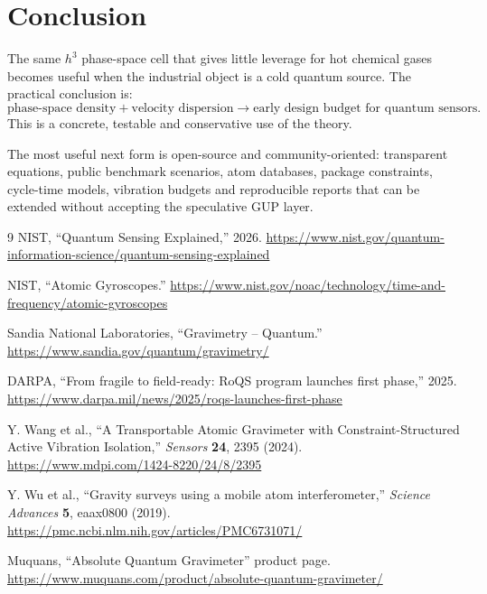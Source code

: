 \documentclass[11pt,a4paper]{article}
\begin{document}
\section{Conclusion}

The same $h^3$ phase-space cell that gives little leverage for hot chemical
gases becomes useful when the industrial object is a cold quantum source. The
practical conclusion is:
\begin{equation}
\text{phase-space density}+\text{velocity dispersion}
\longrightarrow
\text{early design budget for quantum sensors}.
\end{equation}
This is a concrete, testable and conservative use of the theory.

The most useful next form is open-source and community-oriented: transparent
equations, public benchmark scenarios, atom databases, package constraints,
cycle-time models, vibration budgets and reproducible reports that can be
extended without accepting the speculative GUP layer.

\begin{thebibliography}{9}
NIST, ``Quantum Sensing Explained,'' 2026.
\url{https://www.nist.gov/quantum-information-science/quantum-sensing-explained}

NIST, ``Atomic Gyroscopes.''
\url{https://www.nist.gov/noac/technology/time-and-frequency/atomic-gyroscopes}

Sandia National Laboratories, ``Gravimetry -- Quantum.''
\url{https://www.sandia.gov/quantum/gravimetry/}

DARPA, ``From fragile to field-ready: RoQS program launches first phase,'' 2025.
\url{https://www.darpa.mil/news/2025/roqs-launches-first-phase}

Y. Wang et al.,
``A Transportable Atomic Gravimeter with Constraint-Structured Active Vibration
Isolation,''
\emph{Sensors} \textbf{24}, 2395 (2024).
\url{https://www.mdpi.com/1424-8220/24/8/2395}

Y. Wu et al.,
``Gravity surveys using a mobile atom interferometer,''
\emph{Science Advances} \textbf{5}, eaax0800 (2019).
\url{https://pmc.ncbi.nlm.nih.gov/articles/PMC6731071/}

Muquans,
``Absolute Quantum Gravimeter'' product page.
\url{https://www.muquans.com/product/absolute-quantum-gravimeter/}
\end{thebibliography}
\end{document}
